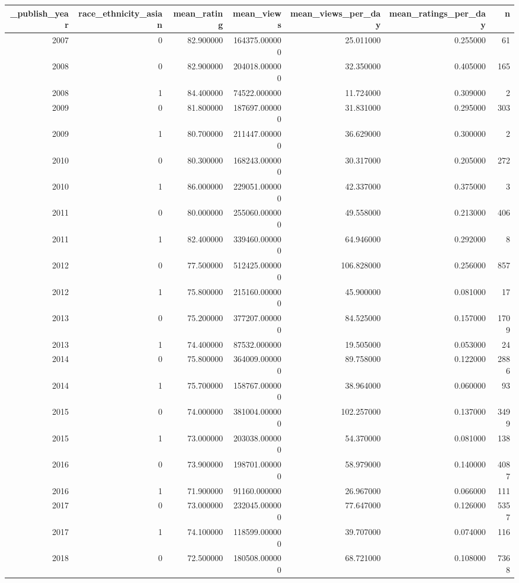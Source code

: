 \begin{tabular}{rrrrrrr}
\toprule
_publish_year & race_ethnicity_asian & mean_rating & mean_views & mean_views_per_day & mean_ratings_per_day & n \\
\midrule
2007 & 0 & 82.900000 & 164375.000000 & 25.011000 & 0.255000 & 61 \\
2008 & 0 & 82.900000 & 204018.000000 & 32.350000 & 0.405000 & 165 \\
2008 & 1 & 84.400000 & 74522.000000 & 11.724000 & 0.309000 & 2 \\
2009 & 0 & 81.800000 & 187697.000000 & 31.831000 & 0.295000 & 303 \\
2009 & 1 & 80.700000 & 211447.000000 & 36.629000 & 0.300000 & 2 \\
2010 & 0 & 80.300000 & 168243.000000 & 30.317000 & 0.205000 & 272 \\
2010 & 1 & 86.000000 & 229051.000000 & 42.337000 & 0.375000 & 3 \\
2011 & 0 & 80.000000 & 255060.000000 & 49.558000 & 0.213000 & 406 \\
2011 & 1 & 82.400000 & 339460.000000 & 64.946000 & 0.292000 & 8 \\
2012 & 0 & 77.500000 & 512425.000000 & 106.828000 & 0.256000 & 857 \\
2012 & 1 & 75.800000 & 215160.000000 & 45.900000 & 0.081000 & 17 \\
2013 & 0 & 75.200000 & 377207.000000 & 84.525000 & 0.157000 & 1709 \\
2013 & 1 & 74.400000 & 87532.000000 & 19.505000 & 0.053000 & 24 \\
2014 & 0 & 75.800000 & 364009.000000 & 89.758000 & 0.122000 & 2886 \\
2014 & 1 & 75.700000 & 158767.000000 & 38.964000 & 0.060000 & 93 \\
2015 & 0 & 74.000000 & 381004.000000 & 102.257000 & 0.137000 & 3499 \\
2015 & 1 & 73.000000 & 203038.000000 & 54.370000 & 0.081000 & 138 \\
2016 & 0 & 73.900000 & 198701.000000 & 58.979000 & 0.140000 & 4087 \\
2016 & 1 & 71.900000 & 91160.000000 & 26.967000 & 0.066000 & 111 \\
2017 & 0 & 73.000000 & 232045.000000 & 77.647000 & 0.126000 & 5357 \\
2017 & 1 & 74.100000 & 118599.000000 & 39.707000 & 0.074000 & 116 \\
2018 & 0 & 72.500000 & 180508.000000 & 68.721000 & 0.108000 & 7368 \\

\end{tabular}
